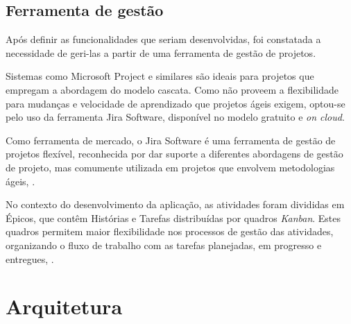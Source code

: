 \documentclass[
    12pt,               %
    openright,          %
    oneside,
    a4paper,            %
    BIBLATEX,           %
    TODO,               %
    english,            %
    brazil              %
    ]{ifsp-spo-inf-ctds}
\begin{document}

    \subsection{Ferramenta de gestão}
  
        Após definir as funcionalidades que seriam desenvolvidas, foi constatada a necessidade de geri-las a partir de uma ferramenta de gestão de projetos.
        
        Sistemas como Microsoft Project e similares são ideais para projetos que empregam a abordagem do modelo cascata. Como não proveem a flexibilidade para mudanças e velocidade de aprendizado que projetos ágeis exigem, optou-se pelo uso da ferramenta Jira Software, disponível no modelo gratuito e \emph{on cloud}.
        
        Como ferramenta de mercado, o Jira Software é uma ferramenta de gestão de projetos flexível, reconhecida por dar suporte a diferentes abordagens de gestão de projeto, mas comumente utilizada em projetos que envolvem metodologias ágeis, .
        
        No contexto do desenvolvimento da aplicação, as atividades foram divididas em Épicos, que contêm Histórias e Tarefas distribuídas por quadros \emph{Kanban}. Estes quadros permitem maior flexibilidade nos processos de gestão das atividades, organizando o fluxo de trabalho com as tarefas planejadas, em progresso e entregues, .
        

    \section{Arquitetura}
        

        
\end{document}

